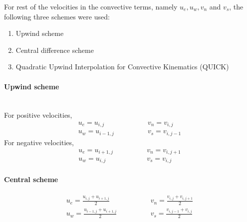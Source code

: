 \documentclass[12pt,a4paper,fleqn]{article}
\begin{document}
For rest of the velocities in the convective terms, namely $u_e, u_w, v_n$ and $v_s$, the following three schemes were used:
\begin{enumerate}
\setlength\itemsep{0em}
\item Upwind scheme
\item Central difference scheme
\item Quadratic Upwind Interpolation for Convective Kinematics (QUICK)
\end{enumerate}

\paragraph{Upwind scheme}\mbox{}\\
For positive velocities,
\begin{equation*}
\begin{aligned}
u_e = u_{i,j}\\
u_w = u_{i-1,j}
\end{aligned}
\qquad\qquad
\begin{aligned}
v_n = v_{i,j}\\
v_s = v_{i,j-1}
\end{aligned}
\end{equation*}
For negative velocities,
\begin{equation*}
\begin{aligned}
u_e = u_{i+1,j}\\
u_w = u_{i,j}
\end{aligned}
\qquad\qquad
\begin{aligned}
v_n = v_{i,j+1}\\
v_s = v_{i,j}
\end{aligned}
\end{equation*}

\paragraph{Central scheme}
\begin{equation*}
\begin{aligned}
u_e = \frac{u_{i,j} + u_{i+1,j}}{2}\\
u_w = \frac{u_{i-1,j} + u_{i+1,j}}{2}
\end{aligned}
\qquad\qquad
\begin{aligned}
v_n = \frac{v_{i,j} + v_{i,j+1}}{2}\\
v_s = \frac{v_{i,j-1} + v_{i,j}}{2}
\end{aligned}
\end{equation*}
\end{document}
